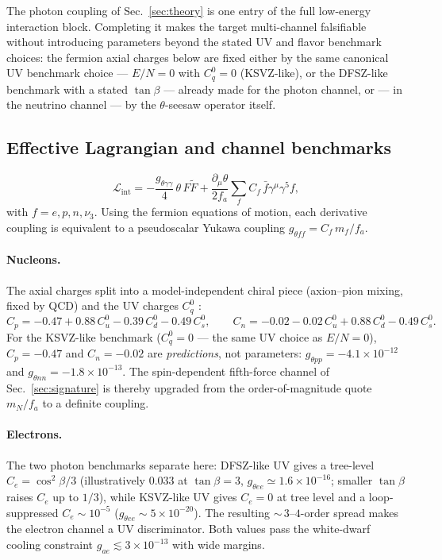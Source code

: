 \documentclass[11pt,a4paper]{article}
\begin{document}
The photon coupling of Sec.~\ref{sec:theory} is one entry of the full
low-energy interaction block. Completing it makes the target multi-channel
falsifiable without introducing parameters beyond the stated UV and flavor
benchmark choices: the fermion axial
charges below are fixed either by the same canonical UV benchmark choice
--- $E/N = 0$ with $C_q^{0} = 0$ (KSVZ-like), or the DFSZ-like benchmark
with a stated $\tan\beta$ --- already made for the photon channel, or ---
in the neutrino channel --- by the
$\theta$-seesaw operator itself.

\subsection{Effective Lagrangian and channel benchmarks}

\begin{equation}
\mathcal{L}_{\mathrm{int}} =
-\frac{g_{\theta\gamma\gamma}}{4}\,\theta\,F\tilde F
+ \frac{\partial_\mu\theta}{2f_a}\sum_{f} C_f\,
\bar f \gamma^\mu\gamma^5 f,
\label{eq:lint}
\end{equation}
with $f = e, p, n, \nu_3$. Using the fermion equations of motion, each
derivative coupling is equivalent to a pseudoscalar Yukawa coupling
$g_{\theta ff} = C_f\, m_f/f_a$.

\paragraph{Nucleons.} The axial charges split into a model-independent
chiral piece (axion--pion mixing, fixed by QCD) and the UV charges
$C_q^{0}$ \cite{AxionLandscape}:
\begin{equation}
C_p = -0.47 + 0.88\,C_u^{0} - 0.39\,C_d^{0} - 0.49\,C_s^{0},\qquad
C_n = -0.02 - 0.02\,C_u^{0} + 0.88\,C_d^{0} - 0.49\,C_s^{0}.
\label{eq:ccharges}
\end{equation}
For the KSVZ-like benchmark ($C_q^{0} = 0$ --- the same UV choice as
$E/N = 0$), $C_p = -0.47$ and $C_n = -0.02$ are \emph{predictions}, not
parameters: $g_{\theta pp} = -4.1\times 10^{-12}$ and
$g_{\theta nn} = -1.8\times 10^{-13}$. The spin-dependent fifth-force
channel of Sec.~\ref{sec:signature} is thereby upgraded from the order-of-magnitude
quote $m_N/f_a$ to a definite coupling.

\paragraph{Electrons.} The two photon benchmarks separate here: DFSZ-like
UV gives a tree-level $C_e = \cos^{2}\!\beta/3$ (illustratively
$0.033$ at $\tan\beta = 3$, $g_{\theta ee} \simeq 1.6\times 10^{-16}$;
smaller $\tan\beta$ raises $C_e$ up to $1/3$), while KSVZ-like UV gives
$C_e = 0$ at tree level and a loop-suppressed
$C_e \sim 10^{-5}$ ($g_{\theta ee} \sim 5\times 10^{-20}$). The resulting
${\sim}\,3$--$4$-order spread makes the electron channel a UV
discriminator. Both values pass
the white-dwarf cooling constraint $g_{ae} \lesssim 3\times 10^{-13}$
\cite{AxionReview} with wide margins.
\end{document}

